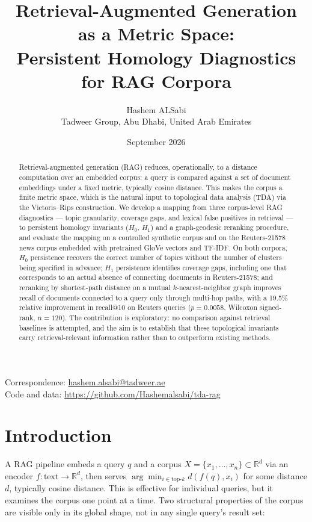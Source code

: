 \documentclass[11pt]{article}
\title{Retrieval-Augmented Generation as a Metric Space:\\
Persistent Homology Diagnostics for RAG Corpora}
\author{Hashem ALSabi\\[2pt] \normalsize Tadweer Group, Abu Dhabi, United Arab Emirates}
\date{September 2026}
\begin{document}
\maketitle

\begin{center}
\small Correspondence: \href{mailto:hashem.alsabi@tadweer.ae}{hashem.alsabi@tadweer.ae}\\
Code and data: \url{https://github.com/Hashemalsabi/tda-rag}
\end{center}
\vspace{0.3cm}

\begin{abstract}
Retrieval-augmented generation (RAG) reduces, operationally, to a distance computation over an embedded corpus: a query is compared against a set of document embeddings under a fixed metric, typically cosine distance. This makes the corpus a finite metric space, which is the natural input to topological data analysis (TDA) via the Vietoris--Rips construction. We develop a mapping from three corpus-level RAG diagnostics — topic granularity, coverage gaps, and lexical false positives in retrieval — to persistent homology invariants ($H_0$, $H_1$) and a graph-geodesic reranking procedure, and evaluate the mapping on a controlled synthetic corpus and on the Reuters-21578 news corpus embedded with pretrained GloVe vectors and TF-IDF. On both corpora, $H_0$ persistence recovers the correct number of topics without the number of clusters being specified in advance; $H_1$ persistence identifies coverage gaps, including one that corresponds to an actual absence of connecting documents in Reuters-21578; and reranking by shortest-path distance on a mutual $k$-nearest-neighbor graph improves recall of documents connected to a query only through multi-hop paths, with a 19.5\% relative improvement in recall@10 on Reuters queries ($p=0.0058$, Wilcoxon signed-rank, $n=120$). The contribution is exploratory: no comparison against retrieval baselines is attempted, and the aim is to establish that these topological invariants carry retrieval-relevant information rather than to outperform existing methods.
\end{abstract}

\section{Introduction}

A RAG pipeline embeds a query $q$ and a corpus $X = \{x_1, \dots, x_n\} \subset \mathbb{R}^d$ via an encoder $f: \text{text} \to \mathbb{R}^d$, then serves $\arg\min_{i \in \text{top-}k} d(f(q), x_i)$ for some distance $d$, typically cosine distance. This is effective for individual queries, but it examines the corpus one point at a time. Two structural properties of the corpus are visible only in its global shape, not in any single query's result set:
\end{document}

